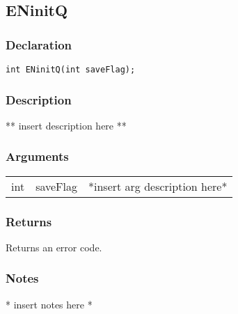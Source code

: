\subsection{ENinitQ}
\subsubsection{Declaration}
\begin{lstlisting}
int ENinitQ(int saveFlag);
\end{lstlisting}
\subsubsection{Description}
** insert description here **
\subsubsection{Arguments}
\begin{tabular}{l r p{11cm} }
int&saveFlag&*insert arg description here* \\[6pt]
\end{tabular}
\subsubsection{Returns}
Returns an error code.
\subsubsection{Notes}
* insert notes here *
